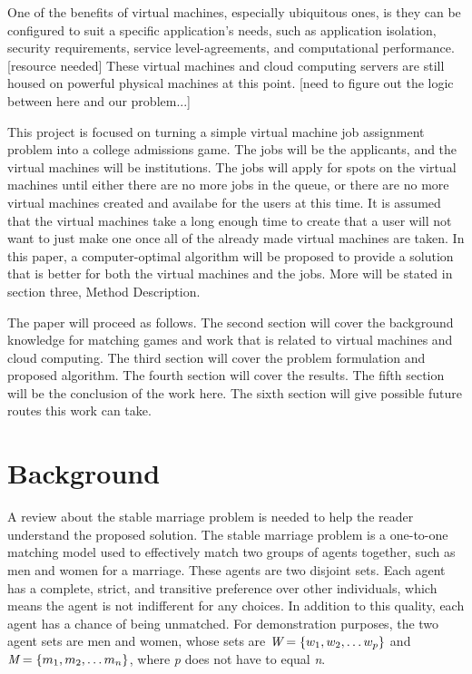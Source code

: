 \documentclass[conference]{IEEEtran}
\begin{document}
One of the benefits of virtual machines, especially ubiquitous
ones, is they can be configured to suit a specific application's
needs, such as application isolation, security requirements,
service level-agreements, and computational performance.  [resource needed]
These virtual machines and cloud computing servers
are still housed on powerful physical machines at this point.
[need to figure out the logic between here and our problem...]

This project is focused on turning a simple virtual machine job assignment
problem into a college admissions game.  The jobs will be the applicants,
and the virtual machines will be institutions.  The jobs will apply for spots
on the virtual machines until either there are no more jobs in the 
queue, or there are no more virtual machines created and availabe for the
users at this time.  It is assumed that the virtual machines take a long
enough time to create that a user will not want to just make one
once all of the already made virtual machines are taken.  In this paper,
a computer-optimal algorithm will be proposed to provide a solution
that is better for both the virtual machines and the jobs.  More will be stated
in section three, Method Description.

The paper will proceed as follows.  The second section will cover the
background knowledge for matching games and work that is 
related to virtual machines and cloud computing.  The third section
will cover the problem formulation and proposed algorithm.  The 
fourth section will cover the results.  The fifth section will
be the conclusion of the work here.  The sixth section will
give possible future routes this work can take.  

\section{Background}
A review about the stable marriage problem is needed
to help the reader understand the proposed solution.
The stable marriage problem is a one-to-one matching
model used to effectively match two groups of agents
 together, such as men and women for a marriage.  
These agents are two disjoint sets.  Each agent
has a complete, strict, and  transitive preference over other
individuals, which means the agent is not indifferent for any choices.  In 
addition to this quality, each agent has a chance
of being unmatched. For demonstration purposes,
the two agent sets are men and women, whose sets are 
\( \emph{W} = \{ {w_1}, {w_2}, \ldots {w_p} \} \) and
\( \emph{M} =\{ {m_1}, {m_2}, \ldots {m_n} \} \), 
where \emph{p} does not have to equal \emph{n}.
\end{document}
